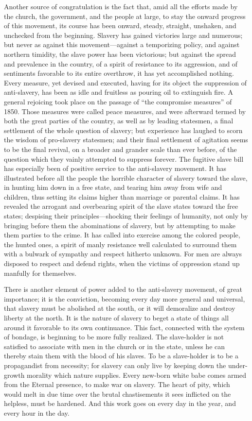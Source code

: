 Another source of congratulation is the fact that, amid all the efforts
made by the church, the government, and the people at large, to stay the
onward progress of this movement, its course has been onward, steady,
straight, unshaken, and unchecked from the beginning. Slavery has gained
victories large and numerous; but never as against this
movement---against a temporizing policy, and against northern timidity,
the slave power has been victorious; but against the spread and
prevalence in the country, of a spirit of resistance to its aggression,
and of sentiments favorable to its entire overthrow, it has yet
accomplished nothing. Every measure, yet devised and executed, having
for its object the suppression of anti-slavery, has been as idle and
fruitless as pouring oil to extinguish fire. A general rejoicing took
place on the passage of ``the compromise measures'' of 1850. Those
measures were called peace measures, and were afterward termed by both
the great parties of the country, as well as by leading statesmen, a
final settlement of the whole question of slavery; but experience has
laughed to scorn the wisdom of pro-slavery statesmen; and their final
settlement of agitation seems to be the final revival, on a broader and
grander scale than ever before, of the question which they vainly
attempted to suppress forever. The fugitive slave bill has especially
been of positive service to the anti-slavery movement. It has
illustrated before all the people the horrible character of slavery
toward the slave, in hunting him down in a free state, and tearing him
away from wife and children, thus setting its claims higher than
marriage or parental claims. It has revealed the arrogant and
overbearing spirit of the slave states toward the free states; despising
their principles---shocking their feelings of humanity, not only by
bringing before them the abominations of slavery, but by attempting to
make them parties to the crime. It has called into exercise among the
colored people, the hunted ones, a spirit of manly resistance well
calculated to surround {}them with a bulwark of sympathy and respect
hitherto unknown. For men are always disposed to respect and defend
rights, when the victims of oppression stand up manfully for themselves.

There is another element of power added to the anti-slavery movement, of
great importance; it is the conviction, becoming every day more general
and universal, that slavery must be abolished at the south, or it will
demoralize and destroy liberty at the north. It is the nature of slavery
to beget a state of things all around it favorable to its own
continuance. This fact, connected with the system of bondage, is
beginning to be more fully realized. The slave-holder is not satisfied
to associate with men in the church or in the state, unless he can
thereby stain them with the blood of his slaves. To be a slave-holder is
to be a propagandist from necessity; for slavery can only live by
keeping down the under-growth morality which nature supplies. Every
new-born white babe comes armed from the Eternal presence, to make war
on slavery. The heart of pity, which would melt in due time over the
brutal chastisements it sees inflicted on the helpless, must be
hardened. And this work goes on every day in the year, and every hour in
the day.

